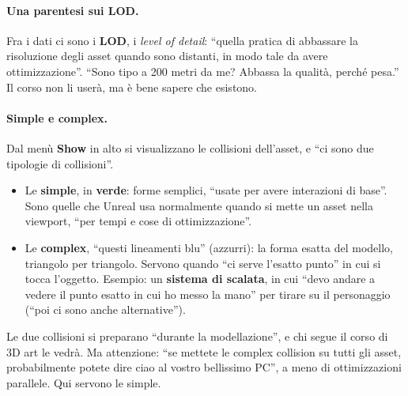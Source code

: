 \paragraph{Una parentesi sui LOD.} Fra i dati ci sono i \textbf{LOD}, i \emph{level of
detail}: ``quella pratica di abbassare la risoluzione degli asset quando sono distanti,
in modo tale da avere ottimizzazione''. ``Sono tipo a 200 metri da me? Abbassa la
qualità, perché pesa.'' Il corso non li userà, ma è bene sapere che esistono.

\paragraph{Simple e complex.} Dal menù \textbf{Show} in alto si visualizzano le
collisioni dell'asset, e ``ci sono due tipologie di collisioni''.
\begin{itemize}
  \item Le \textbf{simple}, in \textbf{verde}: forme semplici, ``usate per avere
        interazioni di base''. Sono quelle che Unreal usa normalmente quando si mette un
        asset nella viewport, ``per tempi e cose di ottimizzazione''.
  \item Le \textbf{complex}, ``questi lineamenti blu'' (azzurri): la forma esatta del
        modello, triangolo per triangolo. Servono quando ``ci serve l'esatto punto''
        in cui si tocca l'oggetto. Esempio: un \textbf{sistema di scalata}, in cui
        ``devo andare a vedere il punto esatto in cui ho messo la mano'' per tirare su il
        personaggio (``poi ci sono anche alternative'').
\end{itemize}
Le due collisioni si preparano ``durante la modellazione'', e chi segue il corso di 3D
art le vedrà. Ma attenzione: ``se mettete le complex collision su tutti gli asset,
probabilmente potete dire ciao al vostro bellissimo PC'', a meno di ottimizzazioni
parallele. Qui servono le simple.

